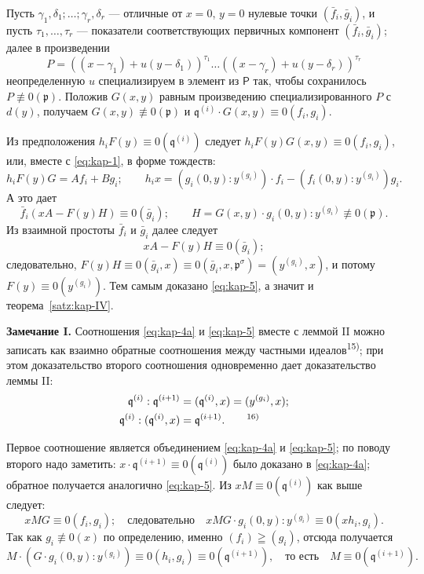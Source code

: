 \documentclass[11pt]{article}
\theoremstyle{plain}
\begin{document}
Пусть $\gamma_{1}, \delta_{1}; \ldots; \gamma_{r}, \delta_{r}$ ---
отличные от $x = 0$, $y = 0$ нулевые точки
$(\bar{f}_{i}, \bar{g}_{i})$, и пусть
$\tau_{1}, \ldots, \tau_{r}$ --- показатели соответствующих
первичных компонент $(\bar{f}_{i}, \bar{g}_{i})$; далее в произведении
\[
P = ((x-\gamma_{1}) + u(y-\delta_{1}))^{\tau_{1}} \ldots
((x-\gamma_{r}) + u(y-\delta_{r}))^{\tau_{r}}
\]
неопределенную $u$ специализируем в элемент из $\mathsf{P}$ так, чтобы
сохранилось $P \not\equiv 0(\mathfrak{p})$. Положив $G(x,y)$ равным
произведению специализированного $P$ с $d(y)$, получаем
$G(x,y) \not\equiv 0(\mathfrak{p})$ и
$\mathfrak{q}^{(i)} \cdot G(x,y) \equiv 0(f_{i}, g_{i})$.

Из предположения $h_{i}F(y) \equiv 0(\mathfrak{q}^{(i)})$ следует
$h_{i}F(y)G(x,y) \equiv 0(f_{i}, g_{i})$, или, вместе с
\eqref{eq:kap-1}, в форме тождеств:
\[
h_{i}F(y)G = Af_{i} + Bg_{i}; \qquad
h_{i}x = (g_{i}(0,y):y^{(g_{i})})\cdot f_{i}
       - (f_{i}(0,y):y^{(g_{i})})g_{i}.
\]
А это дает
\[
\bar{f}_{i}(xA - F(y)H) \equiv 0(\bar{g}_{i}); \qquad
H = G(x,y) \cdot g_{i}(0,y):y^{(g_{i})} \not\equiv 0(\mathfrak{p}).
\]
Из взаимной простоты $\bar{f}_{i}$ и $\bar{g}_{i}$ далее следует
\[
xA - F(y)H \equiv 0(\bar{g}_{i});
\]
следовательно,
$F(y)H \equiv 0(\bar{g}_{i}, x)
\equiv 0(\bar{g}_{i}, x, \mathfrak{p}^{\sigma})
= (y^{(g_{i})}, x)$, и потому $F(y) \equiv 0(y^{(g_{i})})$.
Тем самым доказано \eqref{eq:kap-5}, а значит и
теорема~\ref{satz:kap-IV}.

\smallskip
\textbf{Замечание I.} Соотношения \eqref{eq:kap-4a} и
\eqref{eq:kap-5} вместе с леммой II можно записать как взаимно
обратные соотношения между частными идеалов\textsuperscript{15)};
при этом доказательство второго соотношения одновременно дает
доказательство леммы II:
\begin{equation}\label{eq:kap-6}
\begin{aligned}
\mathfrak{q}^{(i)} : \mathfrak{q}^{(i+1)}
  &= (\mathfrak{q}^{(i)}, x) = (y^{(g_{i})}, x);\\
\mathfrak{q}^{(i)} : (\mathfrak{q}^{(i)}, x)
  &= \mathfrak{q}^{(i+1)}.\qquad\text{\textsuperscript{16)}}
\end{aligned}
\end{equation}

Первое соотношение является объединением \eqref{eq:kap-4a} и
\eqref{eq:kap-5}; по поводу второго надо заметить:
$x \cdot \mathfrak{q}^{(i+1)} \equiv 0(\mathfrak{q}^{(i)})$ было
доказано в \eqref{eq:kap-4a}; обратное получается аналогично
\eqref{eq:kap-5}. Из $xM \equiv 0(\mathfrak{q}^{(i)})$ как выше
следует:
\[
xMG \equiv 0(f_{i}, g_{i}); \quad \text{следовательно}\quad
xMG \cdot g_{i}(0,y):y^{(g_{i})} \equiv 0(xh_{i}, g_{i}).
\]
Так как $g_{i} \not\equiv 0(x)$ по определению, именно
$(f_i)\geqq(g_i)$, отсюда получается
\[
M \cdot (G \cdot g_{i}(0,y):y^{(g_{i})})
\equiv 0(h_{i}, g_{i}) \equiv 0(\mathfrak{q}^{(i+1)}),
\quad \text{то есть}\quad M \equiv 0(\mathfrak{q}^{(i+1)}).
\]
\end{document}

